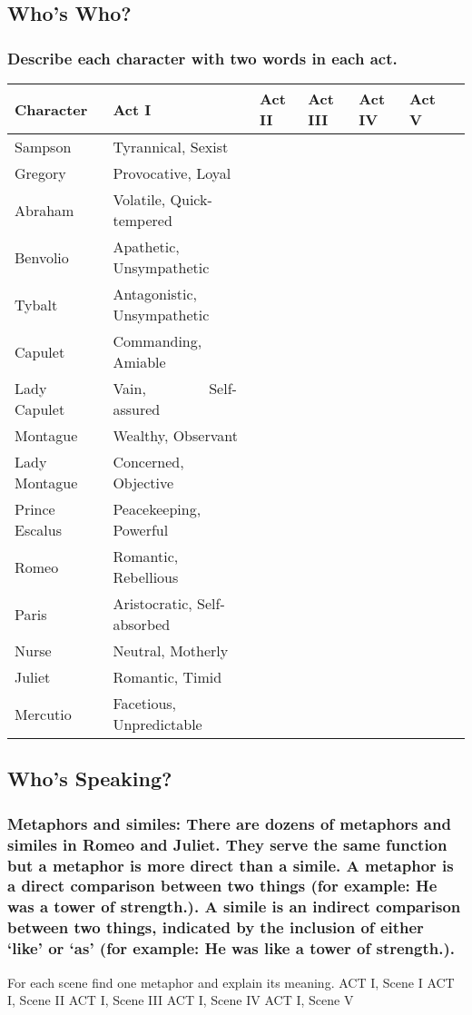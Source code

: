 \documentclass{article}
\begin{document}
\subsection{Who's Who?}
\subsubsection{Describe each character with two words in each act.}
\begin{tabular}[t]{p{2.5cm} || p{2cm}*{4}{| p{2cm}}r}
Character & Act I & Act II & Act III & Act IV & Act V \\
\hline \hline
Sampson & Tyrannical, Sexist & & & & \\
\hline
Gregory & Provocative, Loyal & & & & \\
\hline
Abraham & Volatile, Quick-tempered & & & & \\
\hline
Benvolio & Apathetic, Unsympathetic & & & & \\
\hline
Tybalt & Antagonistic, Unsympathetic & & & & \\
\hline
Capulet & Commanding, Amiable & & & & \\
\hline
Lady Capulet & Vain, \ \ \ \ \ \ \ \ Self-assured & & & & \\
\hline
Montague & Wealthy, Observant & & & & \\
\hline
Lady Montague & Concerned, Objective & & & & \\
\hline
Prince Escalus & Peacekeeping, Powerful & & & & \\
\hline
Romeo & Romantic, Rebellious & & & & \\
\hline
Paris & Aristocratic, Self-absorbed & & & & \\
\hline
Nurse & Neutral, Motherly & & & & \\
\hline
Juliet & Romantic, Timid & & & & \\
\hline
Mercutio & Facetious, Unpredictable & & & & \\
\end{tabular}
\subsection{Who's Speaking?}
\subsubsection{Metaphors and similes: There are dozens of metaphors and similes in Romeo and Juliet. They serve the same function but a metaphor is more direct than a simile. A metaphor is a direct comparison between two things (for example: He was a tower of strength.). A simile is an indirect comparison between two things, indicated by the inclusion of either `like' or `as' (for example: He was like a tower of strength.).}
\begin{outline}
\1 For each scene find one metaphor and explain its meaning.
\2 ACT I, Scene I
\3
\2 ACT I, Scene II
\3
\2 ACT I, Scene III
\3
\2 ACT I, Scene IV
\3
\2 ACT I, Scene V
\3
\end{outline}
\end{document}
